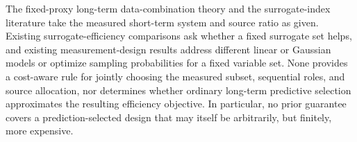 The fixed-proxy long-term data-combination theory and the surrogate-index literature take the measured short-term system and source ratio as given. Existing surrogate-efficiency comparisons ask whether a fixed surrogate set helps, and existing measurement-design results address different linear or Gaussian models or optimize sampling probabilities for a fixed variable set. None provides a cost-aware rule for jointly choosing the measured subset, sequential roles, and source allocation, nor determines whether ordinary long-term predictive selection approximates the resulting efficiency objective. In particular, no prior guarantee covers a prediction-selected design that may itself be arbitrarily, but finitely, more expensive.